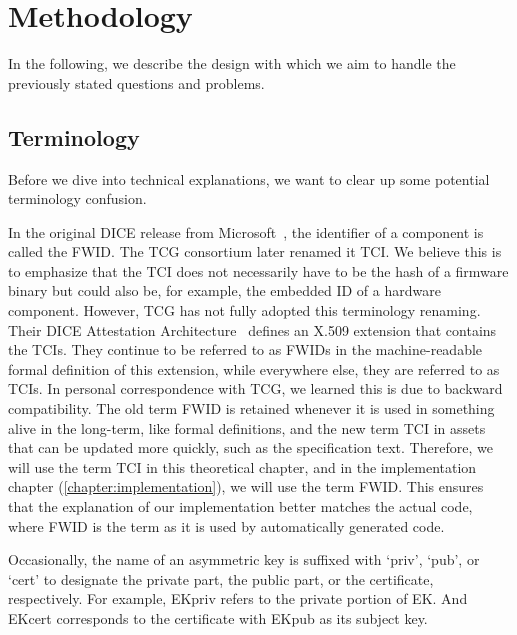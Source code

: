 
\chapter{Methodology}\label{chapter:methodology}

In the following, we describe the design with which we aim to handle the previously stated questions and problems.

\section{Terminology}\label{sec:terminology}

Before we dive into technical explanations, we want to clear up some potential terminology confusion.

In the original DICE release from Microsoft~\cite{England2016}, the identifier of a component is called the \ac{FWID}.
The \ac{TCG} consortium later renamed it \ac{TCI}.
We believe this is to emphasize that the TCI does not necessarily have to be the hash of a firmware binary but could also be, for example, the embedded ID of a hardware component.
However, \ac{TCG} has not fully adopted this terminology renaming.
Their DICE Attestation Architecture~\cite{TCGAttestation2021} defines an X.509 extension that contains the \acp{TCI}.
They continue to be referred to as \acp{FWID} in the machine-readable formal definition of this extension, while everywhere else, they are referred to as \acp{TCI}.
In personal correspondence with \ac{TCG}, we learned this is due to backward compatibility.
The old term \ac{FWID} is retained whenever it is used in something alive in the long-term, like formal definitions, and the new term \ac{TCI} in assets that can be updated more quickly, such as the specification text.
Therefore, we will use the term \ac{TCI} in this theoretical chapter, and in the implementation chapter (\autoref{chapter:implementation}), we will use the term \ac{FWID}\@.
This ensures that the explanation of our implementation better matches the actual code, where \ac{FWID} is the term as it is used by automatically generated code.

Occasionally, the name of an asymmetric key is suffixed with `priv', `pub', or `cert' to designate the private part, the public part, or the certificate, respectively.
For example, EKpriv refers to the private portion of EK\@.
And EKcert corresponds to the certificate with EKpub as its subject key.

